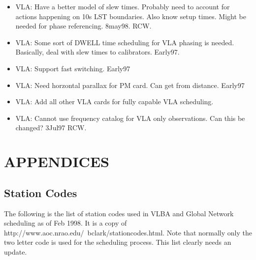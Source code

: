 \documentclass{report}
\begin{document}
\begin{itemize}
\item VLA:  Have a better model of slew times.  Probably need to account
      for actions happening on 10s LST boundaries.  Also know setup times.
      Might be needed for phase referencing.  8may98. RCW.

\item VLA:  Some sort of DWELL time scheduling for VLA phasing
      is needed.  Basically, deal with slew times to calibrators.  Early97.

\item VLA:  Support fast switching.  Early97

\item VLA:  Need horzontal parallax for PM card.  Can get from
      distance.  Early97

\item VLA:  Add all other VLA cards for fully capable VLA scheduling.

\item VLA:  Cannot use frequency catalog for VLA only observations.
      Can this be changed?  3Jul97 RCW.

\end{itemize}


\appendix

\chapter{\label{APP:APPENDICES}APPENDICES}


\section{\label{APP:STACODES}Station Codes}

The following is the list of station codes used in VLBA and Global
Network scheduling as of Feb 1998.  It is a copy of
{http://www.aoc.nrao.edu/~bclark/stationcodes.html}.
Note that normally only the two letter code is used for the
scheduling process.  This list clearly needs an update.
\end{document}
